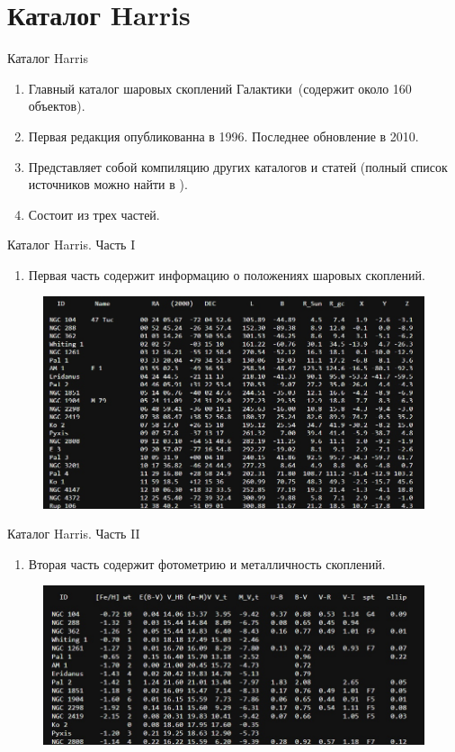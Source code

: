 \documentclass{beamer}
\begin{document}
    \section{Каталог Harris}
    \begin{frame}{Каталог Harris}
        \begin{enumerate}[]
            \item Главный каталог шаровых скоплений Галактики~(содержит около 160 объектов)\cite{HarrisDat}.
            \item Первая редакция опубликованна в 1996. Последнее обновление в 2010.
            \item Представляет собой компиляцию других каталогов и статей (полный список источников можно найти в \cite{Harris}).
            \item Состоит из трех частей.
        \end{enumerate}
    \end{frame}
    \begin{frame}{Каталог Harris. Часть I}
        \begin{enumerate}[]
            \item Первая часть содержит информацию о положениях шаровых скоплений.
        \end{enumerate}
        \begin{figure}[h]
            \centering
            \includegraphics[width=0.8\linewidth]{pictures/HarrisI.jpg}
        \end{figure}
    \end{frame}
    \begin{frame}{Каталог Harris. Часть II}
        \begin{enumerate}[]
            \item Вторая часть содержит фотометрию и металличность скоплений.
        \end{enumerate}
        \begin{figure}[h]
            \centering
            \includegraphics[width=0.8\linewidth]{pictures/HarrisII.jpg}
        \end{figure}
    \end{frame}
\end{document}
